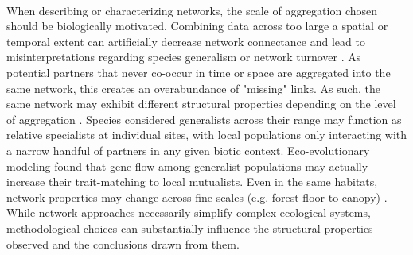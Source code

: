 \paragraph*{}
When describing or characterizing networks, the scale of aggregation chosen should be biologically motivated. Combining data across too large a spatial or temporal extent can artificially decrease network connectance and lead to misinterpretations regarding species generalism or network turnover \parencite{burkle2011future, duchenne2022seasonal}. As potential partners that never co-occur in time or space are aggregated into the same network, this creates an overabundance of "missing" links. As such, the same network may exhibit different structural properties depending on the level of aggregation \parencite{guimaraes2020structure}. Species considered generalists across their range may function as relative specialists at individual sites, with local populations only interacting with a narrow handful of partners in any given biotic context. Eco-evolutionary modeling \parencite{medeiros2018geographic} found that gene flow among generalist populations may actually increase their trait-matching to local mutualists. Even in the same habitats, network properties may change across fine scales (e.g. forest floor to canopy) \parencite{schleuning2011specialization}. While network approaches necessarily simplify complex ecological systems, methodological choices can substantially influence the structural properties observed and the conclusions drawn from them.

